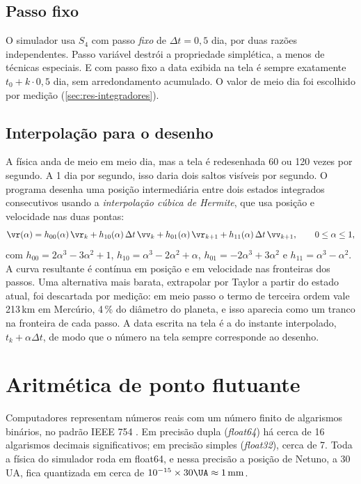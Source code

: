 \subsection{Passo fixo}

O simulador usa $S_4$ com passo \emph{fixo} de $\Delta t = 0{,}5$ dia, por duas razões independentes. Passo variável destrói a propriedade simplética, a menos de técnicas especiais. E com passo fixo a data exibida na tela é sempre exatamente $t_0 + k\cdot 0{,}5$ dia, sem arredondamento acumulado. O valor de meio dia foi escolhido por medição (\autoref{sec:res-integradores}).

\subsection{Interpolação para o desenho}

A física anda de meio em meio dia, mas a tela é redesenhada 60 ou 120 vezes por segundo. A 1 dia por segundo, isso daria dois saltos visíveis por segundo. O programa desenha uma posição intermediária entre dois estados integrados consecutivos usando a \emph{interpolação cúbica de Hermite}, que usa posição e velocidade nas duas pontas:
\begin{equation}
  \vr(\alpha) = h_{00}(\alpha)\,\vr_k + h_{10}(\alpha)\,\Delta t\,\vv_k + h_{01}(\alpha)\,\vr_{k+1} + h_{11}(\alpha)\,\Delta t\,\vv_{k+1},
  \qquad 0\le\alpha\le1,
  \label{eq:hermite}
\end{equation}
com $h_{00} = 2\alpha^3 - 3\alpha^2 + 1$, $h_{10} = \alpha^3 - 2\alpha^2 + \alpha$, $h_{01} = -2\alpha^3 + 3\alpha^2$ e $h_{11} = \alpha^3 - \alpha^2$. A curva resultante é contínua em posição e em velocidade nas fronteiras dos passos. Uma alternativa mais barata, extrapolar por Taylor a partir do estado atual, foi descartada por medição: em meio passo o termo de terceira ordem vale 213\,km em Mercúrio, 4\,\% do diâmetro do planeta, e isso aparecia como um tranco na fronteira de cada passo. A data escrita na tela é a do instante interpolado, $t_k + \alpha\Delta t$, de modo que o número na tela sempre corresponde ao desenho.

\section{Aritmética de ponto flutuante}\label{sec:float}

Computadores representam números reais com um número finito de algarismos binários, no padrão IEEE 754 \cite{ieee754,goldberg1991}. Em precisão dupla (\emph{float64}) há cerca de 16 algarismos decimais significativos; em precisão simples (\emph{float32}), cerca de 7. Toda a física do simulador roda em float64, e nessa precisão a posição de Netuno, a 30\,UA, fica quantizada em cerca de $10^{-15}\times 30\UA \approx 1\,\mathrm{mm}$.

